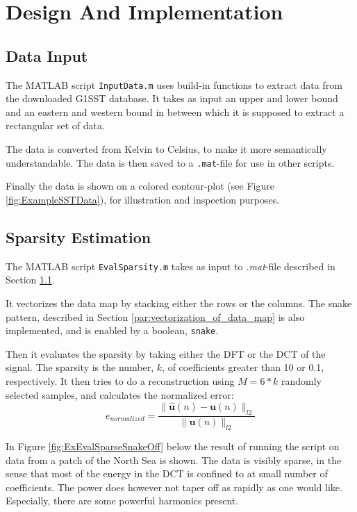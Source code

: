 \documentclass[Main]{subfiles}
\begin{document}
\section{Design And Implementation} %
\label{sec:design_and_implementation}

	\subsection{Data Input} %
	\label{sub:data_input}

		The MATLAB script \texttt{InputData.m} uses build-in functions to extract data from the downloaded G1SST database.
		It takes as input an upper and lower bound and an eastern and western bound in between which it is supposed to extract a rectangular set of data.

		The data is converted from Kelvin to Celsius, to make it more semantically understandable.
		The data is then saved to a \texttt{.mat}-file for use in other scripts.

		Finally the data is shown on a colored contour-plot (see Figure \ref{fig:ExampleSSTData}), for illustration and inspection purposes.

	

	\subsection{Sparsity Estimation} %
	\label{sub:sparsity_estimation}

		The MATLAB script \texttt{EvalSparsity.m} takes as input to \emph{.mat}-file described in Section \ref{sub:data_input}.

		It vectorizes the data map by stacking either the rows or the columns.
		The snake pattern, described in Section \ref{par:vectorization_of_data_map} is also implemented, and is enabled by a boolean, \texttt{snake}.

		Then it evaluates the sparsity by taking either the DFT or the DCT of the signal.
		The sparsity is the number, $k$, of coefficients greater than 10 or 0.1, respectively.
		It then tries to do a reconstruction using $M = 6*k$ randomly selected samples, and calculates the normalized error:
		\begin{equation}
			e_{normalized} = \frac
				{\|\mathbf{\hat{u}}(n) - \mathbf{u}(n)\|_{l2}}
				{\|\mathbf{u}(n)\|_{l2}}
		\end{equation}

		In Figure \ref{fig:ExEvalSparseSnakeOff} below the result of running the script on data from a patch of the North Sea is shown.
		The data is visibly sparse, in the sense that most of the energy in the DCT is confined to at small number of coefficients.
		The power does however not taper off as rapidly as one would like.
		Especially, there are some powerful harmonics present.
\end{document}
